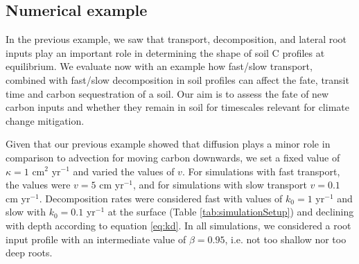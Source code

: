 \documentclass[11pt, oneside, a4paper]{article}   	%
\begin{document}
\subsection{Numerical example}
In the previous example, we saw that transport, decomposition, and lateral root inputs play an important role in determining the shape of soil C profiles at equilibrium. We evaluate now with an example how fast/slow transport, combined with fast/slow decomposition in soil profiles can affect the fate, transit time and carbon sequestration of a soil. Our aim is to assess the fate of new carbon inputs and whether they remain in soil for timescales relevant for climate change mitigation.

Given that our previous example showed that diffusion plays a minor role in comparison to advection for moving carbon downwards, we set a fixed value of $\kappa = 1$ cm$^2$ yr$^{-1}$ and varied the values of $v$. For simulations with fast transport, the values were $v = 5$ cm yr$^{-1}$, and for simulations with slow transport $v = 0.1$ cm yr$^{-1}$. Decomposition rates were considered fast with values of $k_0 = 1$ yr$^{-1}$ and slow with $k_0 = 0.1$ yr$^{-1}$ at the surface (Table \ref{tab:simulationSetup}) and declining with depth according to equation \ref{eq:kd}. In all simulations, we considered a root input profile with an intermediate value of $\beta = 0.95$, i.e. not too shallow nor too deep roots. 
\end{document}
